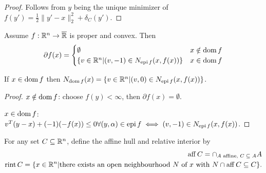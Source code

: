 \begin{proof}
  Follows from $y$ being the unique minimizer of $f(y') = \frac{1}{2}
  \| y' - x \|_{2}^{2} + \delta_{C}(y')$.
\end{proof}

\begin{thm}
  \label{sec:subgradients-8}
  Assume $f: \mathbb{R}^{n} \rightarrow \overline {\mathbb{R}}$ is proper and convex.
  Then
  \begin{equation}
    \label{eq:14}
    \partial f(x) =
    \begin{cases}
      \emptyset & x \notin \operatorname*{dom} f \\
      \{ v \in \mathbb{R}^{n} | (v, -1) \in N_{\operatorname*{epi} f}(x, f(x)) \} & x \in
      \operatorname*{dom} f
    \end{cases}
  \end{equation}

  If $x \in \operatorname*{dom} f$ then $N_{\operatorname*{dom} f}(x) = \{ v \in \mathbb{R}^{n} | (v, 0) \in
  N_{\operatorname*{epi} f}(x, f(x)) \} $.
\end{thm}

\begin{proof}
  $x \notin \operatorname*{dom} f$: choose $f(y) < \infty$, then $\partial f(x) =
  \emptyset$.

  $x \in \operatorname*{dom} f$: $v^{T}(y-x) + (-1)(- f(x)) \leq 0 \forall (y,
  \alpha) \in \operatorname*{epi} f \iff (v, -1) \in N_{\operatorname*{epi} f}(x, f(x))$.
\end{proof}

\begin{defn}
  \label{sec:subgradients-10}
  For any set $C \subseteq \mathbb{R}^{n}$, define the affine hull and relative
  interior by
  \begin{align}
    \label{eq:15}
    \operatorname*{aff} C = \cap_{\text{$A$ affine, $C \subseteq A$}} A \\
    \operatorname*{rint} C = \{ x \in \mathbb{R}^{n} | \text{there exists an open
      neighbourhood $N$ of $x$ with $N \cap \operatorname*{aff} C \subseteq C$} \}.
    \label{eq:16}
  \end{align}
\end{defn}

